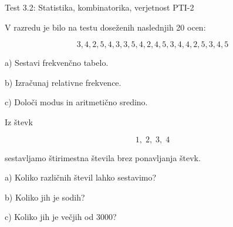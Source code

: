 \documentclass[a4paper,12pt]{letter}
\newcounter{tocke}
\begin{document}
\pagestyle{fancy}
\renewcommand{\headrulewidth}{0pt}
\lhead{}
\chead{}
\rhead{}
\rfoot{\vspace*{-2\baselineskip}}

\renewcommand{\vec}{\overrightarrow}
\everymath{\displaystyle}

\begin{minipage}{20cm}
\begin{bclogo}[
couleur=brown!40,
arrondi=0,
ombre=true,
couleurOmbre=gray!50,
logo=\bcplume,
noborder=true]
{\textrm{{\Large Test 3.2:
\large Statistika, kombinatorika, verjetnost
\hfill PTI-2}}}
\end{bclogo}
\end{minipage}

\vspace{0.2cm}

\begin{minipage}{20cm}
\end{minipage}

\vspace{0.5cm}


\def\tockeA{2+2+2}

\begin{naloga}
[\hfill $\tockeA$]

\addtocounter{tocke}{\tockeA}

V razredu je bilo na testu doseženih naslednjih 20 ocen:

\[
3,4,2,5,4,3,3,5,4,2,4,5,3,4,4,2,5,3,4,5
\]

a) Sestavi frekvenčno tabelo.

b) Izračunaj relativne frekvence.

c) Določi modus in aritmetično sredino.

\end{naloga}

\vspace{0.3cm}

\newpage
\def\tockeB{2+2+2}

\begin{naloga}
[\hfill $\tockeB$]

\addtocounter{tocke}{\tockeB}

Iz števk

\[
1,\;2,\;3,\;4
\]

sestavljamo štirimestna števila brez ponavljanja števk.

a) Koliko različnih števil lahko sestavimo?

b) Koliko jih je sodih?

c) Koliko jih je večjih od 3000?

\end{naloga}
\end{document}
